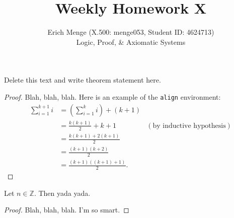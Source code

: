 \documentclass[12pt]{article}
\newcommand{\Z}{\mathbb{Z}}
\newenvironment{theorem}[2][Theorem]{\begin{trivlist}
\item[\hskip \labelsep {\bfseries #1}\hskip \labelsep {\bfseries #2.}]}{\end{trivlist}}
\begin{document}

\title{Weekly Homework X}%
\author{Erich Menge (X.500: menge053, Student ID: 4624713) \\ %
Logic, Proof, \& Axiomatic Systems} %

\maketitle

\begin{theorem}{x.yz} %
Delete this text and write theorem statement here.
\end{theorem}

\begin{proof}
Blah, blah, blah.  Here is an example of the \texttt{align} environment:
\begin{align*}
\sum_{i=1}^{k+1}i & = \left(\sum_{i=1}^{k}i\right) +(k+1)\\
& = \frac{k(k+1)}{2}+k+1 & (\text{by inductive hypothesis})\\
& = \frac{k(k+1)+2(k+1)}{2}\\
& = \frac{(k+1)(k+2)}{2}\\
& = \frac{(k+1)((k+1)+1)}{2}.
\end{align*}
\end{proof}

\begin{theorem}{x.yz}
Let $n\in \Z$.  Then yada yada.
\end{theorem}

\begin{proof}
Blah, blah, blah.  I'm so smart.
\end{proof}

\end{document}
